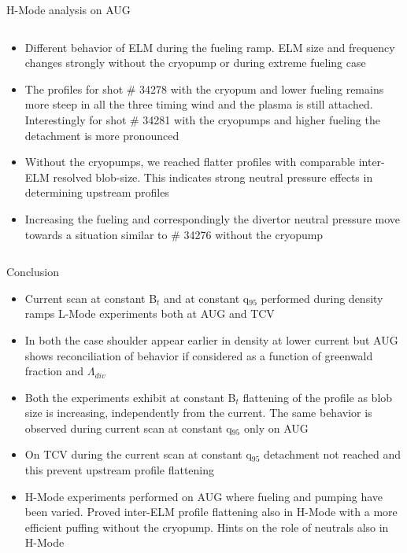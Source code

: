\documentclass[10pt, compress]{beamer}
\newcommand\Fontvi{\fontsize{8}{7.2}\selectfont}
\begin{document}
\begin{frame}{H-Mode analysis on AUG}
\begin{columns}
\begin{column}{0.45\textwidth}
\begin{itemize}
    \item<2|only@2> Different behavior of ELM during the fueling
      ramp. ELM size and frequency changes strongly without the
      cryopump or during extreme fueling case
    \item<3|only@3> The profiles for shot \# 34278 with the cryopum
      and lower fueling remains more steep in all the three timing
      wind and the plasma is still attached. Interestingly for shot \#
      34281 with the cryopumps and higher fueling the detachment is
      more pronounced
    \item<4|only@4> Without the cryopumps, we reached flatter
         profiles with comparable inter-ELM resolved blob-size. This
         indicates strong neutral pressure effects in determining
         upstream profiles
    \item<5|only@5> Increasing the fueling and correspondingly the
      divertor neutral pressure move towards a situation similar to
      \# 34276 without the cryopump
      \end{itemize}
  \end{column}
\end{columns}
\end{frame}

\begin{frame}{Conclusion}
  \Fontvi
  \begin{itemize}
    \item Current scan at constant B$_t$ and at constant q$_{95}$
      performed during density ramps L-Mode experiments both at AUG
      and TCV
    \item In both the case shoulder appear earlier in density at lower
      current but AUG shows reconciliation of behavior if considered
      as a function of greenwald fraction and $\Lambda_{div}$
    \item Both the experiments exhibit at constant B$_t$ flattening of the profile as
      blob size is increasing, independently from the current. The
      same behavior is observed during current scan at constant
      q$_{95}$ \alert{only on AUG}
    \item On TCV during the current scan at constant q$_{95}$
      detachment not reached and this \alert{prevent upstream profile
        flattening}
    \item H-Mode experiments performed on AUG where fueling and
      pumping have been varied. Proved inter-ELM profile flattening
      also in H-Mode with a more efficient puffing without the
      cryopump. \alert{Hints on the role of neutrals also in H-Mode}
  \end{itemize}
\end{frame}
\end{document}
